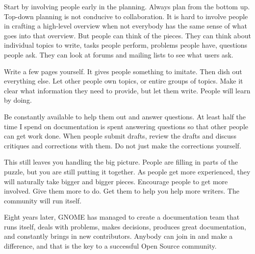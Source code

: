 Start by involving people early in the planning. Always plan from the
bottom up. Top-down planning is not conducive to collaboration. It is
hard to involve people in crafting a high-level overview when not
everybody has the same sense of what goes into that overview. But
people can think of the pieces. They can think about individual topics
to write, tasks people perform, problems people have, questions people
ask. They can look at forums and mailing lists to see what users ask.

Write a few pages yourself. It gives people something to imitate. Then
dish out everything else. Let other people own topics, or entire groups
of topics. Make it clear what information they need to provide, but let
them write. People will learn by doing.

Be constantly available to help them out and answer questions. At least
half the time I spend on documentation is spent answering questions so
that other people can get work done. When people submit drafts, review
the drafts and discuss critiques and corrections with them. Do not just
make the corrections yourself.

This still leaves you handling the big picture. People are filling in
parts of the puzzle, but you are still putting it together. As people
get more experienced, they will naturally take bigger and bigger pieces.
Encourage people to get more involved. Give them more to do. Get them
to help you help more writers. The community will run itself.

Eight years later, GNOME has managed to create a documentation team
that runs itself, deals with problems, makes decisions, produces great
documentation, and constantly brings in new contributors. Anybody can
join in and make a difference, and that is the key to a successful Open
Source community.

